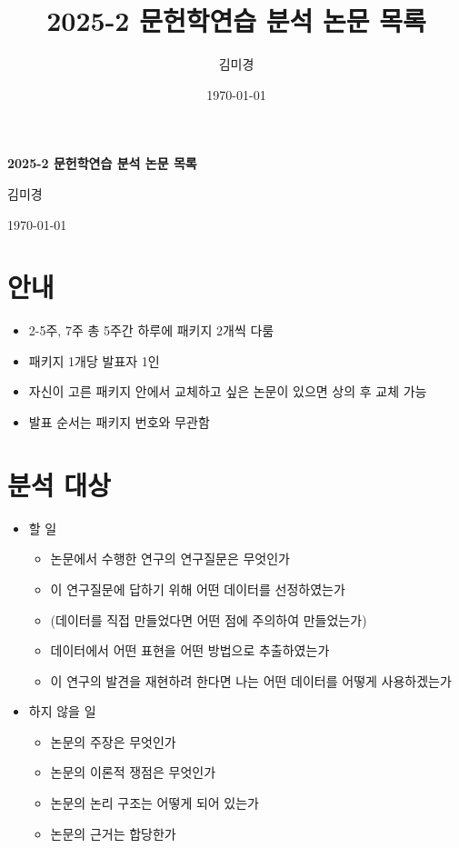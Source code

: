 \documentclass[twoside,openright]{report}
\begin{document}
\title{2025-2 문헌학연습 분석 논문 목록}
\author{김미경}
\date{\today}



\begin{center}
    {\Large\bfseries 2025-2 문헌학연습 분석 논문 목록\par} %
    \vspace{1.5em} %
    {\large 김미경\par} %
    \vspace{0.5em} %
    {\normalsize \today\par} %
\end{center}
\vspace{2em} %

\section*{안내}
\begin{itemize}
  \item 2-5주, 7주 총 5주간 하루에 패키지 2개씩 다룸
  \item 패키지 1개당 발표자 1인
  \item 자신이 고른 패키지 안에서 교체하고 싶은 논문이 있으면 상의 후 교체 가능
  \item 발표 순서는 패키지 번호와 무관함
\end{itemize}
\section*{분석 대상}

\begin{itemize}
  \item 할 일
    \begin{itemize}
      \item 논문에서 수행한 연구의 연구질문은 무엇인가
      \item 이 연구질문에 답하기 위해 어떤 데이터를 선정하였는가
      \item (데이터를 직접 만들었다면 어떤 점에 주의하여 만들었는가)
      \item 데이터에서 어떤 표현을 어떤 방법으로 추출하였는가
      \item 이 연구의 발견을 재현하려 한다면 나는 어떤 데이터를 어떻게 사용하겠는가
    \end{itemize}
  \item 하지 않을 일
    \begin{itemize}
      \item 논문의 주장은 무엇인가
      \item 논문의 이론적 쟁점은 무엇인가
      \item 논문의 논리 구조는 어떻게 되어 있는가
      \item 논문의 근거는 합당한가
    \end{itemize}
\end{itemize}
\end{document}
